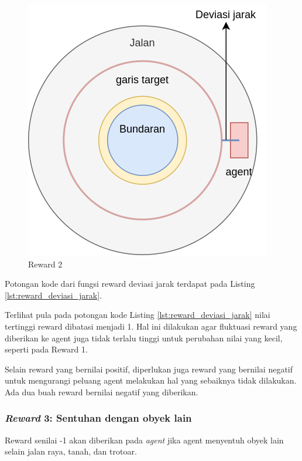 \begin{figure}[H] 
	\centering
	\includegraphics[width=.85\linewidth]{images/reward_deviasi_jarak}
	\caption{Reward 2}
	\label{fig:reward_deviasi_jarak}
\end{figure}

Potongan kode dari fungsi reward deviasi jarak terdapat pada Listing \ref{lst:reward_deviasi_jarak}.



Terlihat pula pada potongan kode Listing \ref{lst:reward_deviasi_jarak} nilai tertinggi reward dibatasi menjadi 1. Hal ini dilakukan agar fluktuasi reward yang diberikan ke agent juga tidak terlalu tinggi untuk perubahan nilai yang kecil, seperti pada Reward 1.


Selain reward yang bernilai positif, diperlukan juga reward yang bernilai negatif untuk mengurangi peluang agent melakukan hal yang sebaiknya tidak dilakukan. Ada dua buah reward bernilai negatif yang diberikan.

\subsubsection{\textit{Reward} 3: Sentuhan dengan obyek lain}
Reward senilai -1 akan diberikan pada \textit{agent} jika agent menyentuh obyek lain selain jalan raya, tanah, dan trotoar.


